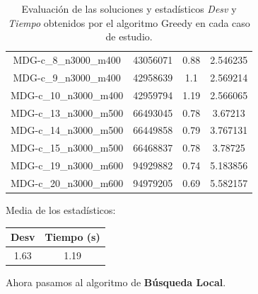 \documentclass{article}
\begin{document}
\begin{table}[H]
\begin{tabular}{|cccc|}
		MDG-c\_8\_n3000\_m400 & 43056071 & 0.88 & 2.546235\\
		MDG-c\_9\_n3000\_m400 & 42958639 & 1.1 & 2.569214\\
		MDG-c\_10\_n3000\_m400 & 42959794 & 1.19 & 2.566065\\
		MDG-c\_13\_n3000\_m500 & 66493045 & 0.78 & 3.67213\\
		MDG-c\_14\_n3000\_m500 & 66449858 & 0.79 & 3.767131\\
		MDG-c\_15\_n3000\_m500 & 66468837 & 0.78 & 3.78725\\
		MDG-c\_19\_n3000\_m600 & 94929882 & 0.74 & 5.183856\\
		MDG-c\_20\_n3000\_m600 & 94979205 & 0.69 & 5.582157\\
		\hline
	\end{tabular}
	\caption{Evaluación de las soluciones y estadísticos \emph{Desv} y \emph{Tiempo} obtenidos por el algoritmo Greedy
		en cada caso de estudio.}
	\label{tab:greedy}
\end{table}

Media de los estadísticos:
\begin{table}[H]
	\centering
	\begin{tabular}{|cc|}
		\hline
		Desv & Tiempo (s)\\ \hline
		1.63 & 1.19 \\
		\hline
	\end{tabular}
\end{table}

\pagebreak

Ahora pasamos al algoritmo de \textbf{Búsqueda Local}.
\end{document}
